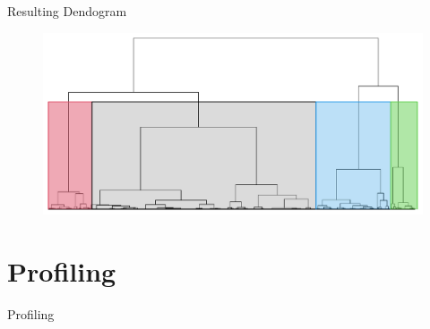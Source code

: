 \begin{frame}{Resulting Dendogram}
\begin{figure}[H]
    \centering
    \includegraphics[width=0.8\linewidth]{cluster-dendo-h3-color}
    \label{fig:dendogram-final}
\end{figure}
\end{frame}

\section{Profiling}
\begin{frame}[allowframebreaks]{Profiling}

\begin{columns}
\begin{column}{0.5\textwidth}
\end{column}
\begin{column}{0.5\textwidth}  %
\end{column}
\end{columns}

\framebreak

\begin{columns}
\begin{column}{0.5\textwidth}
\end{column}
\begin{column}{0.5\textwidth}  %
\end{column}
\end{columns}
\end{frame}

